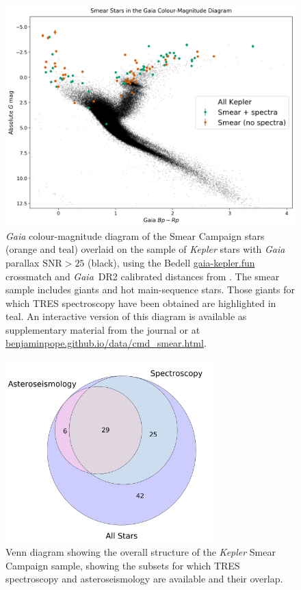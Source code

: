 \documentclass[a4paper,fleqn,usenatbib]{mnras}
\newcommand{\kepler}{\emph{Kepler}\xspace}
\newcommand{\gaia}{\emph{Gaia}\xspace}
\begin{document}
\begin{figure}
\noindent\includegraphics[width=15cm,keepaspectratio]{gaia_kepler_hr.png}

\caption{\label{hrdiagram}
\gaia colour-magnitude diagram of the Smear Campaign stars (orange and teal) overlaid on the sample of \kepler stars with \gaia parallax $\text{SNR} > 25$ (black), using the Bedell \url{gaia-kepler.fun} crossmatch and \gaia~DR2 calibrated distances from \citet{gaiadists}. The smear sample includes giants and hot main-sequence stars. Those giants for which TRES spectroscopy have been obtained are highlighted in teal. An interactive version of this diagram is available as supplementary material from the journal or at \url{benjaminpope.github.io/data/cmd_smear.html}.}
\end{figure}

\begin{figure}
\noindent\includegraphics[width=8cm,keepaspectratio]{venn.png}
\caption{\label{venn}
Venn diagram showing the overall structure of the \kepler Smear Campaign sample, showing the subsets for which TRES spectroscopy and asteroseismology are available and their overlap.}
\end{figure}
\end{document}
